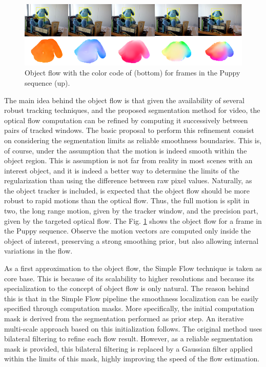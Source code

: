   \begin{figure}[thpb]
      \centering
      \includegraphics[width=1.0\textwidth]{../images/objectflow.png}
      \caption{Object flow with the color code of \cite{c17} (bottom) for frames in the Puppy sequence (up). }
      \label{of}
   \end{figure}

The main idea behind the object flow is that given the availability of several robust tracking techniques, and the proposed
segmentation method for video, the optical flow computation can be refined by computing it successively between pairs
of tracked windows. The basic proposal to perform this refinement consist on considering the segmentation limits  as reliable smoothness boundaries. 
This is, of course, under the assumption that the motion is indeed smooth within the object region. 
This is assumption is not far from reality in most scenes with an interest object, and it is indeed a better way to determine the limits of the regularization 
than using the difference between raw pixel values.
Naturally, as the object tracker is included, is expected that the object flow should be more robust to rapid motions than the
optical flow. 
Thus, the full motion is split in two, the long range motion, given by the tracker window, and the precision part, given by the targeted optical flow. The Fig. \ref{of} shows 
the object flow for a frame in the Puppy sequence. Observe the motion vectors are computed only inside the object of interest, preserving a strong smoothing prior, but 
also allowing internal variations in the flow. 

As a first approximation to the object flow, the Simple Flow technique \cite{c21} is taken as core base. This is because of its scalability 
to higher resolutions and because its specialization to the concept of object flow is only natural. The reason behind this is that in the Simple Flow pipeline 
the smoothness localization can be easily specified through computation masks. More specifically, the initial computation mask is derived from 
the segmentation performed as prior step. An iterative multi-scale approach based on this initialization follows. The original method uses bilateral filtering to refine each flow result. 
However, as a reliable segmentation mask is provided, this bilateral filtering is replaced by a Gaussian filter applied within the limits of this mask, highly improving the speed of the 
flow estimation. 

